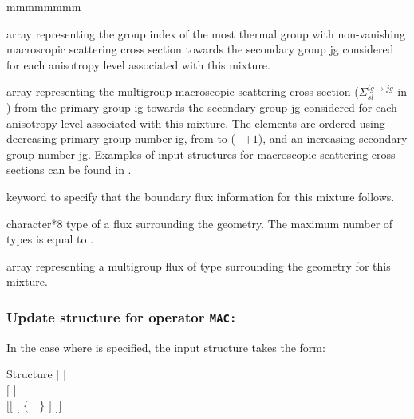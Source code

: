 \begin{ListeDeDescription}{mmmmmmmm}
\item[\dusa{ilastg}] array representing the group index of the most thermal
group with non-vanishing macroscopic scattering cross section towards the
secondary group jg considered for each anisotropy level associated with this
mixture.

\item[\dusa{xsscat}] array representing the multigroup macroscopic scattering
cross section ($\Sigma_{sl}^{ig\to jg}$ in \xsunit) from the primary group ig
towards the secondary group jg considered for each anisotropy level associated
with this mixture. The elements are ordered using decreasing primary group
number ig, from  to ($-$$+1$), and an
increasing secondary group number jg. Examples of input structures for 
macroscopic scattering cross sections can be
found in .

\item[\moc{ADF}] keyword to specify that the boundary flux information for this mixture follows.

\item[\dusa{hadf}] character*8 type of a flux surrounding the geometry. The maximum number of types is equal to .

\item[\dusa{xadf}] array representing a multigroup flux of type  surrounding the geometry for this
mixture. 

\end{ListeDeDescription}

\subsubsection{Update structure for operator {\tt MAC:}}\label{sect:descmacupd}
 
In the case where  is specified, the  input structure takes
the form:

\begin{DataStructure}{Structure }
$[$   $]$ \\
$[$   $]$ \\
$[[$   $[$  $\{$  $|$  $\}$ $]$ $]]$ \\
\moc{;}
\end{DataStructure}

